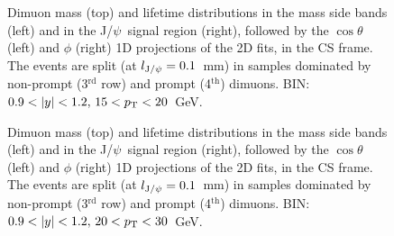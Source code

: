 \documentclass[12pt]{article}
\newcommand{\JPsi}{J/$\psi$}
\begin{document}
\begin{figure}[htbp]
\centering
{}
\caption{Dimuon mass (top) and lifetime distributions in the mass side bands 
(left) and in the \JPsi\ signal region (right), followed by the
$\cos\theta$ (left) and $\phi$ (right) 1D projections of the 2D fits,
in the CS frame. The events are split (at $l_{{\rm J}/\psi} = 0.1$~mm) 
in samples dominated by non-prompt (3$^\mathrm{rd}$ row) and 
prompt (4$^\mathrm{th}$) dimuons. BIN: $0.9 <|y|<1.2,\, 15 < p_{\rm T} < 20$~GeV.}
\end{figure}
\clearpage

\begin{figure}[htbp]
\centering
{}
\caption{Dimuon mass (top) and lifetime distributions in the mass side bands 
(left) and in the \JPsi\ signal region (right), followed by the
$\cos\theta$ (left) and $\phi$ (right) 1D projections of the 2D fits,
in the CS frame. The events are split (at $l_{{\rm J}/\psi} = 0.1$~mm) 
in samples dominated by non-prompt (3$^\mathrm{rd}$ row) and 
prompt (4$^\mathrm{th}$) dimuons. BIN: $0.9 <|y|<1.2,\, 20 < p_{\rm T} < 30$~GeV.}
\end{figure}
\clearpage


\end{document}
